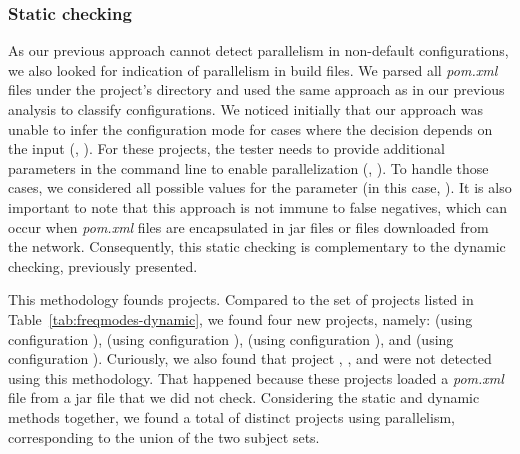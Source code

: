 \subsubsection{Static checking}
\label{sec:rqC-2}
As our previous approach cannot detect parallelism in non-default
configurations, we also looked for indication of parallelism in build
files.  We
parsed all \emph{pom.xml} files under the project's directory and used
the same approach as in our previous analysis to classify
configurations.  We noticed initially that our approach was unable to
infer the configuration mode for cases where the decision depends on
the input (\eg,
). For these
projects, the tester needs to provide additional parameters in the
command line to enable parallelization (\eg, ). To handle those cases, we
considered all possible values for the parameter (in this case,
).  It is also important to note that this
approach is not immune to false negatives, which can occur when
\emph{pom.xml} files are encapsulated in jar files or files downloaded from
the network.  Consequently, this static checking is complementary to
the dynamic checking, previously presented.

This methodology founds \numProjectsParStatic{} projects.
Compared to the set of projects listed in
Table~\ref{tab:freqmodes-dynamic}, we found four new projects, namely:
 (using
configuration \ParClassParMeth),  (using configuration
\ForkSeq{}),  (using configuration \ForkSeq), and
 (using configuration \ParClassParMeth).
Curiously, we also found that project , ,
and  were not detected using this methodology.
That happened because these projects loaded a \emph{pom.xml} file from
a jar file that we did not check.
Considering the static and dynamic methods together, we found a total
of \numProjectsParTotal{} distinct projects using parallelism,
corresponding to the union of the two subject sets.

\vspace{1ex}
\begin{center}
\end{center}
\vspace{1ex}


